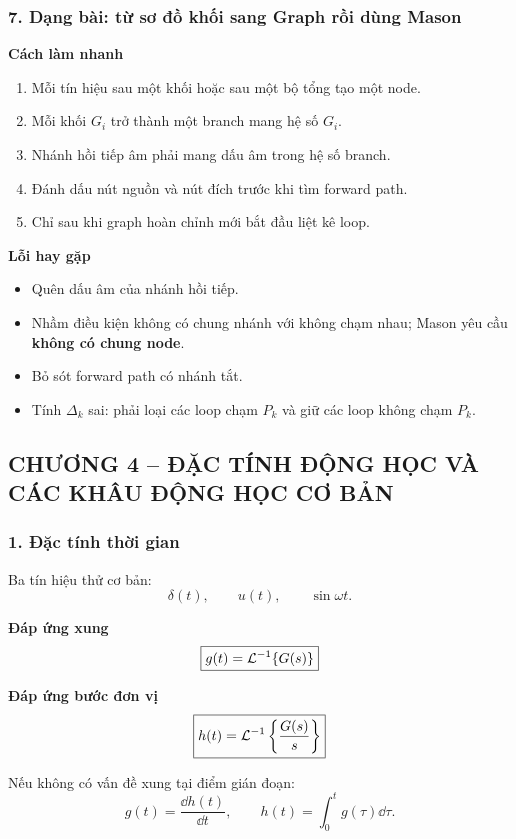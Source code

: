 \subsubsection*{7. Dạng bài: từ sơ đồ khối sang Graph rồi dùng Mason}

\textbf{Cách làm nhanh}
\begin{enumerate}
  \item Mỗi tín hiệu sau một khối hoặc sau một bộ tổng tạo một node.
  \item Mỗi khối $G_i$ trở thành một branch mang hệ số $G_i$.
  \item Nhánh hồi tiếp âm phải mang dấu âm trong hệ số branch.
  \item Đánh dấu nút nguồn và nút đích trước khi tìm forward path.
  \item Chỉ sau khi graph hoàn chỉnh mới bắt đầu liệt kê loop.
\end{enumerate}

\textbf{Lỗi hay gặp}
\begin{itemize}
  \item Quên dấu âm của nhánh hồi tiếp.
  \item Nhầm điều kiện không có chung nhánh với không chạm nhau; Mason yêu cầu \textbf{không có chung node}.
  \item Bỏ sót forward path có nhánh tắt.
  \item Tính $\Delta_k$ sai: phải loại các loop chạm $P_k$ và giữ các loop không chạm $P_k$.
\end{itemize}


\subsection*{CHƯƠNG 4 -- ĐẶC TÍNH ĐỘNG HỌC VÀ CÁC KHÂU ĐỘNG HỌC CƠ BẢN}

\subsubsection*{1. Đặc tính thời gian}

Ba tín hiệu thử cơ bản:
\[
\delta(t),\qquad u(t),\qquad \sin\omega t.
\]

\textbf{Đáp ứng xung}
\[
\boxed{
g(t)=\mathcal{L}^{-1}\{G(s)\}
}
\]

\textbf{Đáp ứng bước đơn vị}
\[
\boxed{
h(t)=\mathcal{L}^{-1}\left\{\frac{G(s)}{s}\right\}
}
\]

Nếu không có vấn đề xung tại điểm gián đoạn:
\[
\boxed{
g(t)=\frac{\dd h(t)}{\dd t},
\qquad
h(t)=\int_0^t g(\tau)\dd\tau.
}
\]

